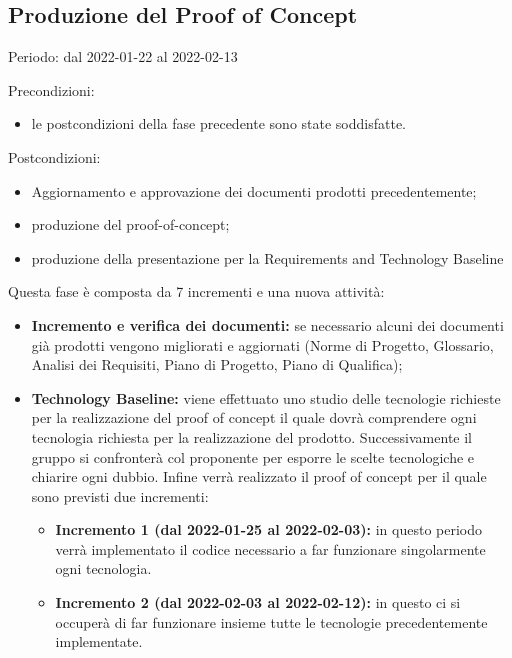 \subsection{Produzione del Proof of Concept}
Periodo: dal 2022-01-22 al 2022-02-13 \newline

Precondizioni:
\begin{itemize}
    \item le postcondizioni della fase precedente sono state soddisfatte.
\end{itemize}

Postcondizioni:
\begin{itemize}
    \item Aggiornamento e approvazione dei documenti prodotti precedentemente;
    \item produzione del proof-of-concept;
    \item produzione della presentazione per la Requirements and Technology Baseline
\end{itemize}

Questa fase è composta da 7 incrementi e una nuova attività:
\begin{itemize}
    \item \textbf{Incremento e verifica dei documenti:} se necessario alcuni dei documenti già
    prodotti vengono migliorati e aggiornati (Norme di Progetto, Glossario,
    Analisi dei Requisiti, Piano di Progetto, Piano di Qualifica);
    \item \textbf{Technology Baseline:} viene effettuato uno studio delle tecnologie richieste per la realizzazione del proof of concept il quale dovrà comprendere ogni tecnologia richiesta per la realizzazione del prodotto. Successivamente il gruppo si confronterà col proponente per esporre le scelte tecnologiche e chiarire ogni dubbio. Infine verrà realizzato il proof of concept per il quale sono previsti due incrementi:
    \begin{itemize}
        \item \textbf{Incremento 1 (dal 2022-01-25 al 2022-02-03):} in questo periodo verrà implementato il codice necessario a far funzionare singolarmente ogni tecnologia.
        \item \textbf{Incremento 2 (dal 2022-02-03 al 2022-02-12):} in questo ci si occuperà di far funzionare insieme tutte le tecnologie precedentemente implementate.
    \end{itemize}
\end{itemize}

